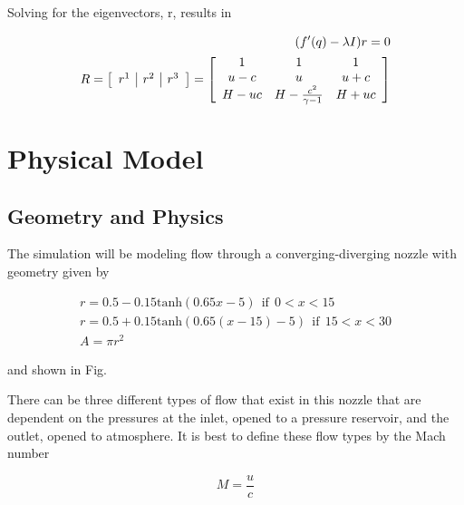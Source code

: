 \documentclass[11pt]{article}%
\numberwithin{equation}{section}
\begin{document}
Solving for the eigenvectors, r, results in

\begin{equation}
\begin{split}
(f'(q) - \lambda I) r = 0 \\
R = \left[ \begin{array}{c |c | c} r^1 & r^2 & r^3 \end{array} \right]= \left[ \begin{array}{ccc} 1 & 1 & 1 \\ u- c & u  & u + c \\ H - u c &  H - \frac{c^2}{\gamma - 1} & H + u c   \end{array} \right] 
\end{split}
\end{equation}

\section{Physical Model}
\subsection{Geometry and Physics}
The simulation will be modeling flow through a converging-diverging nozzle with geometry given by

\begin{equation}
\begin{split}
r = 0.5 - 0.15 \text{tanh}(0.65x - 5) \ \ \text{if} \ \ 0 < x < 15 \\
r = 0.5 + 0.15 \text{tanh}(0.65(x - 15) - 5) \ \ \text{if} \ \ 15 < x < 30 \\
A = \pi r^2
\end{split}
\end{equation}

and shown in Fig. 

There can be three different types of flow that exist in this nozzle that are dependent on the pressures at the inlet, opened to a pressure reservoir, and the outlet, opened to atmosphere. It is best to define these flow types by the Mach number

\begin{equation}
M = \frac{u}{c}
\end{equation} 
\end{document}
